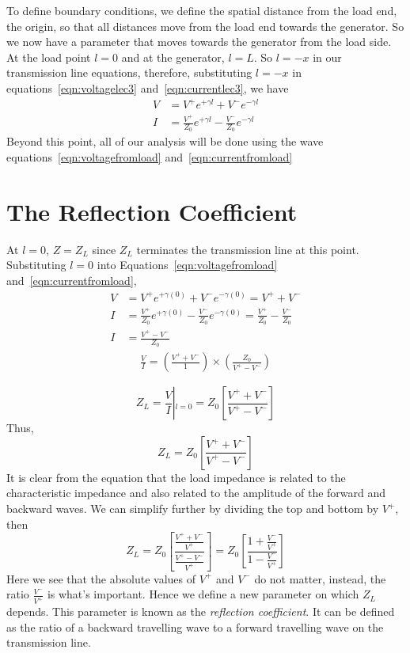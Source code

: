 To define boundary conditions, we define the spatial distance from the load end, the origin, so that all distances move from the load end towards the generator. So we now have a parameter that moves towards the generator from the load side. At the load point $l = 0$ and at the generator, $l = L$. So $l = -x$ in our transmission line equations, therefore, substituting $l = -x$ in equations~\ref{eqn:voltagelec3} and~\ref{eqn:currentlec3}, we have
\begin{align}
V &= V^+e^{+\gamma l}+V^-e^{-\gamma l}
\label{eqn:voltagefromload}\\
I &= \frac{V^+}{Z_0}e^{+\gamma l}-\frac{V^-}{Z_0}e^{-\gamma l}
\label{eqn:currentfromload}
\end{align}
Beyond this point, all of our analysis will be done using the wave equations~\eqref{eqn:voltagefromload} and~\eqref{eqn:currentfromload}

\section{The Reflection Coefficient}
At $l = 0$, $Z = Z_L$ since $Z_L$ terminates the transmission line at this point. Substituting $l = 0$ into Equations~\eqref{eqn:voltagefromload} and~\eqref{eqn:currentfromload},
\begin{align*}
V &= V^+e^{+\gamma (0)}+V^-e^{-\gamma (0)} = V^+ + V^-\\
I &= \frac{V^+}{Z_0}e^{+\gamma (0)}-\frac{V^-}{Z_0}e^{-\gamma (0)} = \frac{V^+}{Z_0} - \frac{V^-}{Z_0} \\
I &= \frac{V^+ - V^-}{Z_0}
\end{align*}
\begin{align*}
\frac{V}{I} = \left( \frac{V^+ + V^-}{1}\right) \times \left( \frac{Z_0}{V^+ - V^-}\right) 
\end{align*}

\begin{equation*}
Z_{L} = \frac{V}{I}\left|_{l = 0} = Z_0 \left[ \frac{V^+ + V^-}{V^+ - V^-} \right]\right.  
\end{equation*}
Thus,
\begin{equation}
Z_L = Z_0 \left[\frac{V^+ + V^-}{V^+ - V^-} \right]
\end{equation}
It is clear from the equation that the load impedance is related to the characteristic impedance and also related to the amplitude of the forward and backward waves. We can simplify further by dividing the top and bottom by $V^+$, then
\begin{dmath}
Z_L = Z_0\left[ \frac{\frac{V^+ + V^-}{V^+}}{\frac{V^+ - V^-}{V^+}}\right]
= Z_0\left[ \frac{1+ \frac{V^-}{V^+}}{1 - \frac{V^-}{V^+}}\right] 
\label{eqn:impedatload}
\end{dmath}
Here we see that the absolute values of $V^+$ and $V^-$ do not matter, instead, the ratio $\frac{V^-}{V^+}$ is what's important. Hence we define a new parameter on which $Z_L$ depends. This parameter is known as the \emph{reflection coefficient}. It can be defined as the ratio of a backward travelling wave to a forward travelling wave on the transmission line.

